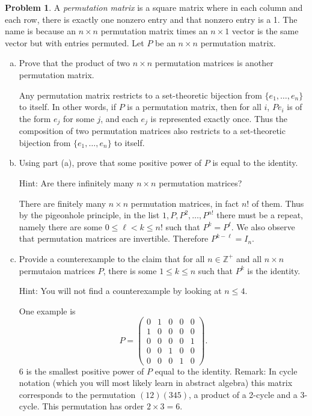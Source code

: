 \documentclass[11pt,oneside]{amsart}
\theoremstyle{definition}
\newtheorem{problem}{Problem}
\newcommand{\bZ}{\mathbb{Z}}
\begin{document}
    \begin{problem}
        A \emph{permutation matrix} is a square matrix where in each column and each row, there is exactly one nonzero entry and that nonzero entry is a 1. The name is because an $n\times n$ permutation matrix times an $n\times 1$ vector is the same vector but with entries permuted. Let $P$ be an $n\times n$ permutation matrix.
        \begin{enumerate}[(a)]
            \item Prove that the product of two $n\times n$ permutation matrices is another permutation matrix.
            \begin{solution}
                Any permutation matrix restricts to a set-theoretic bijection from $\{e_1,\dots,e_n\}$ to itself. In other words, if $P$ is a permutation matrix, then for all $i$, $Pe_i$ is of the form $e_j$ for some $j$, and each $e_j$ is represented exactly once. Thus the composition of two permutation matrices also restricts to a set-theoretic bijection from $\{e_1,\dots,e_n\}$ to itself.
            \end{solution}
            \item Using part (a), prove that some positive power of $P$ is equal to the identity.
            
            Hint: Are there infinitely many $n\times n$ permutation matrices?
            \begin{solution}
                There are finitely many $n\times n$ permutation matrices, in fact $n!$ of them. Thus by the pigeonhole principle, in the list $1,P,P^2,\dots,P^{n!}$ there must be a repeat, namely there are some $0\leq \ell< k\leq n!$ such that $P^k=P^\ell$. We also observe that permutation matrices are invertible. Therefore $P^{k-\ell}=I_n$.
            \end{solution}
            \item Provide a counterexample to the claim that for all $n\in\bZ^+$ and all $n\times n$ permutaion matrices $P$, there is some $1\leq k\leq n$ such that $P^k$ is the identity.
            
            Hint: You will not find a counterexample by looking at $n\leq 4$.
            \begin{solution}
                One example is
                \[P=\begin{pmatrix}
                    0&1&0&0&0\\
                    1&0&0&0&0\\
                    0&0&0&0&1\\
                    0&0&1&0&0\\
                    0&0&0&1&0
                \end{pmatrix}.\]
                6 is the smallest positive power of $P$ equal to the identity.
                Remark: In cycle notation (which you will most likely learn in abstract algebra) this matrix corresponds to the permutation $(12)(345)$, a product of a 2-cycle and a 3-cycle. This permutation has order $2\times 3=6$.
            \end{solution}
        \end{enumerate}
    \end{problem}
\end{document}
